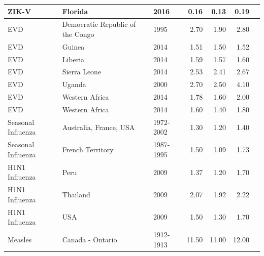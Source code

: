 \documentclass[12pt]{article}
\begin{document}
\begin{landscape}
\begin{table}
\begin{tabular}{@{}lllrrrl@{}}
  ZIK-V                & Florida                          & 2016                          & 0.16        & 0.13           & 0.19           & \cite{dinh2016}       \\ \hline
EVD                 & Democratic Republic of the Congo & 1995                          & 2.70         & 1.90            & 2.80            & \cite{legrand2007}  \\  
  EVD                 & Guinea                           & 2014                          & 1.51        & 1.50            & 1.52           & \cite{althaus2014}   \\
  EVD                 & Liberia                          & 2014                          & 1.59        & 1.57           & 1.60            & \cite{althaus2014}    \\
  EVD                 & Sierra Leone                     & 2014                          & 2.53        & 2.41           & 2.67           & \cite{althaus2014}      \\
EVD                 & Uganda                           & 2000                          & 2.70         & 2.50            & 4.10            & \cite{legrand2007}   \\
EVD               & Western Africa                   & 2014                          & 1.78        & 1.60            & 2.00              & \cite{fisman2014}   \\
EVD & Western Africa                   & 2014                          & 1.60         & 1.40            & 1.80            & \cite{towers2014}  \\
\hline
Seasonal Influenza  & Australia, France, USA          & 1972-2002 & 1.30         & 1.20            & 1.40            & \cite{chowell2008}  \\
  Seasonal Influenza  & French Territory                 & 1987-1995                     & 1.50         & 1.09           & 1.73           & \cite{bonabeau1998}  \\ \hline
  H1N1 Influenza     & Peru                             & 2009                          & 1.37        & 1.20            & 1.70            & \cite{desilva2009}        \\   
H1N1 Influenza      & Thailand                         & 2009                          & 2.07        & 1.92           & 2.22           & \cite{desilva2009}     \\
  H1N1 Influenza & USA & 2009 & 1.50 & 1.30 & 1.70 &\cite{towers2009} \\ \hline
  Measles     & Canada - Ontario                  & 1912-1913                         & 11.50        & 11.00           & 12.00            & \cite{anderson1992}     \\

\end{tabular}
\end{table}
\end{landscape}
\end{document}
